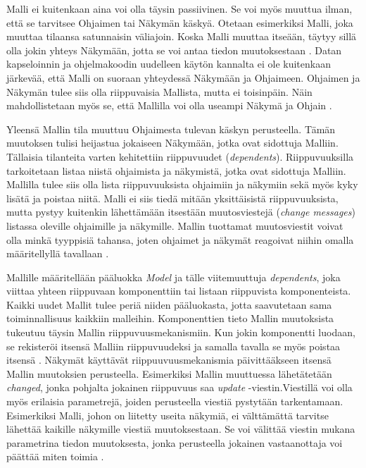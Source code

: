 \documentclass[utf8]{gradu3}
\begin{document}
Malli ei kuitenkaan aina voi olla täysin passiivinen. Se voi myös muuttua ilman, että se tarvitsee Ohjaimen tai Näkymän käskyä. Otetaan esimerkiksi Malli, joka muuttaa tilaansa satunnaisin väliajoin. Koska Malli muuttaa itseään, täytyy sillä olla jokin yhteys Näkymään, jotta se voi antaa tiedon muutoksestaan \parencite{burbeck}. Datan kapseloinnin ja ohjelmakoodin uudelleen käytön kannalta ei ole kuitenkaan järkevää, että Malli on suoraan yhteydessä Näkymään ja Ohjaimeen. Ohjaimen ja Näkymän tulee siis olla riippuvaisia Mallista, mutta ei toisinpäin. Näin mahdollistetaan myös se, että Mallilla voi olla useampi Näkymä ja Ohjain \parencite[s. 4]{krasner_desc}.

Yleensä Mallin tila muuttuu Ohjaimesta tulevan käskyn perusteella. Tämän muutoksen tulisi heijastua jokaiseen Näkymään, jotka ovat sidottuja Malliin. Tällaisia tilanteita varten kehitettiin riippuvuudet (\emph{dependents}).
Riippuvuuksilla tarkoitetaan listaa niistä ohjaimista ja näkymistä, jotka ovat sidottuja Malliin. Mallilla tulee siis olla lista riippuvuuksista ohjaimiin ja näkymiin sekä myös kyky lisätä ja poistaa niitä. Malli ei siis tiedä mitään yksittäisistä riippuvuuksista, mutta pystyy kuitenkin lähettämään itsestään muutosviestejä (\emph{change messages}) listassa oleville ohjaimille ja näkymille. Mallin tuottamat muutosviestit voivat olla minkä tyyppisiä tahansa, joten ohjaimet ja näkymät reagoivat niihin omalla määritellyllä tavallaan  \parencite[s.2-3]{krasner}.

Mallille määritellään pääluokka \emph{Model} ja tälle viitemuuttuja \emph{dependents}, joka viittaa yhteen riippuvaan komponenttiin tai listaan riippuvista komponenteista. Kaikki uudet Mallit tulee periä niiden pääluokasta, jotta saavutetaan sama toiminnallisuus kaikkiin malleihin. Komponenttien tieto Mallin muutoksista tukeutuu täysin Mallin riippuvuusmekanismiin. Kun jokin komponentti luodaan, se rekisteröi itsensä Malliin riippuvuudeksi ja samalla tavalla se myös poistaa itsensä \parencite{burbeck}. Näkymät käyttävät riippuuvuusmekanismia päivittääkseen itsensä Mallin muutoksien perusteella. Esimerkiksi Mallin muuttuessa lähetätetään \textit{changed}, jonka pohjalta jokainen riippuvuus saa \textit{update} -viestin.Viestillä voi olla myös erilaisia parametrejä, joiden perusteella viestiä pystytään tarkentamaan. Esimerkiksi Malli, johon on liitetty useita näkymiä, ei välttämättä tarvitse lähettää kaikille näkymille viestiä muutoksestaan. Se voi välittää viestin mukana parametrina tiedon muutoksesta, jonka perusteella jokainen vastaanottaja voi päättää miten toimia \parencite{burbeck}.
\end{document}
